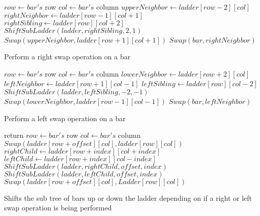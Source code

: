 \begin{algorithm}
	\begin{algorithmic}[1]
			\State $row \gets bar's$ row
			\State $col \gets bar's$ column
			\State $upperNeighbor \gets ladder[row-2][col]$
			\State $rightNeighbor \gets ladder[row-1][col+1]$
			\State $rightSibling \gets ladder[row][col+2]$
			\State $ShiftSubLadder(ladder, rightSibling, 2, 1)$
			\State $Swap(upperNeighbor, ladder[row+1][col+1])$
			\State $Swap(bar, rightNeighbor)$ 
		\EndFunction
	\end{algorithmic}
	\caption{Perform a right swap operation on a bar}
	\label{Alg:RightSwap}
\end{algorithm}
\begin{algorithm}
	\begin{algorithmic}[1]
			\State $row \gets bar's$ row
			\State $col \gets bar's$ column
			\State $lowerNeighbor \gets ladder[row+2][col]$
			\State $leftNeighbor \gets ladder[row+1][col-1]$
			\State $leftSibling \gets ladder[row][col-2]$
			\State $ShiftSubLadder(ladder, leftSibling, -2, -1)$
			\State $Swap(lowerNeighbor, ladder[row-1][col-1])$
			\State $Swap(bar, leftNeighbor)$
		\EndFunction
	\end{algorithmic}
	\caption{Perform a left swap operation on a bar}
	\label{Alg:LeftSwap}
\end{algorithm}
\begin{algorithm}
	\begin{algorithmic}[1]
				\State return
			\EndIf
			\State $row \gets bar's$ row
			\State $col \gets bar's$ column 
				\State $Swap(ladder[row+offset][col], ladder[row][col])$
			\Else 
				\State $rightChild \gets ladder[row+index][col+index]$
				\State $leftChild \gets ladder[row+index][col-index]$
				\State $ShiftSubLadder(ladder, rightChild, offset, index)$
				\State $ShiftSubLadder(ladder, leftChild, offset, index)$
				\State $Swap(ladder[row+offset][col], Ladder[row][col])$
			\EndIf
		\EndFunction
	\end{algorithmic}
	\caption{Shifts the sub tree of bars up or down the ladder depending on if a right or left swap operation is being performed}
	\label{Alg:ShiftChildren}
\end{algorithm}\pagebreak

